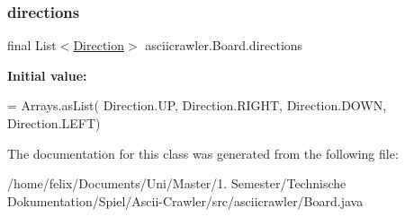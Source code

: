 \subsubsection{\texorpdfstring{directions}{directions}}
{\footnotesize\ttfamily final List$<$\hyperlink{enumasciicrawler_1_1Direction}{Direction}$>$ asciicrawler.\+Board.\+directions\hspace{0.3cm}{\ttfamily [static]}}

{\bfseries Initial value\+:}
\begin{DoxyCode}
= Arrays.asList(
            Direction.UP, Direction.RIGHT, Direction.DOWN, Direction.LEFT)
\end{DoxyCode}


The documentation for this class was generated from the following file\+:\begin{DoxyCompactItemize}
\item 
/home/felix/\+Documents/\+Uni/\+Master/1. Semester/\+Technische Dokumentation/\+Spiel/\+Ascii-\/\+Crawler/src/asciicrawler/Board.\+java\end{DoxyCompactItemize}
